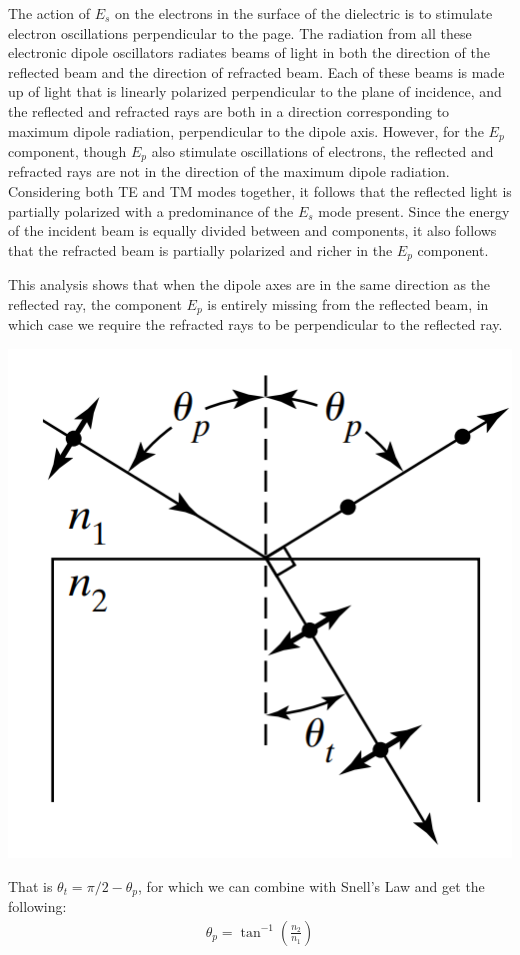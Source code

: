 \documentclass[11pt]{book}
\theoremstyle{break}
\theoremstyle{break}
\begin{document}
 The action of $E_s$ on the electrons in the surface of the dielectric is to stimulate electron oscillations perpendicular to the page. The radiation from all these electronic dipole oscillators radiates beams of light in both the direction of the reflected beam and the direction of refracted beam. Each of these beams is made up of light that is linearly polarized perpendicular to the plane of incidence, and the reflected and refracted rays are both in a direction corresponding to maximum dipole radiation, perpendicular to the dipole axis. However, for the $E_p$ component, though $E_p$ also stimulate oscillations of electrons, the reflected and refracted rays are not in the direction of the maximum dipole radiation. Considering both TE and TM modes together, it follows that the reflected light is partially polarized with a predominance of the $E_s$ mode present. Since the energy of the incident beam is equally divided between and components, it also follows that the refracted beam is partially polarized and richer in the
$E_p$ component.

This analysis shows that when the dipole axes are in the same direction as the reflected ray, the component $E_p$ is entirely missing from the reflected
beam, in which case we require the refracted rays to be perpendicular to the reflected ray. 
\begin{center}
\includegraphics[scale=0.39]{Brewster}
\end{center}
That is $\theta_t  = \pi/2 - \theta_p$, for which we can combine with Snell's Law and get the following:
\begin{align*}
\theta_p = \tan^{-1}\left( \frac{n_2}{n_1}\right) \tag{Brewster's Law}
\end{align*}
\end{document}
